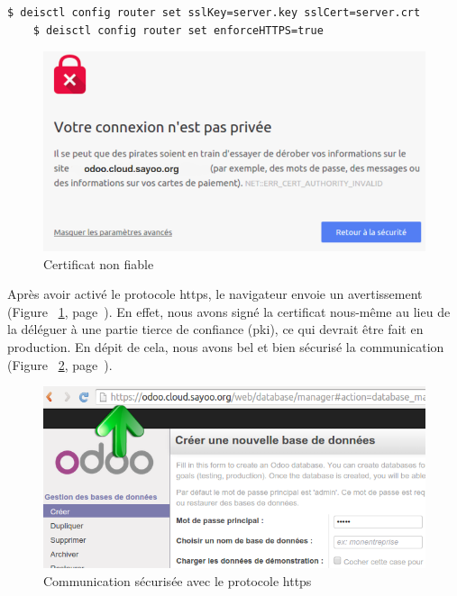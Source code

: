 \begin{onehalfspace}
\begin{lstlisting}[language=bash,caption=Activation du protocole SSL]
	$ deisctl config router set sslKey=server.key sslCert=server.crt
	$ deisctl config router set enforceHTTPS=true
\end{lstlisting}

\begin{figure}[H]
\centering
\includegraphics [scale=0.5]{chapitre5/assets/certificat}
\caption{Certificat non fiable}
\label{fig:certificat}
\end{figure}

Après avoir activé le protocole \acrshort{https}, le navigateur envoie un avertissement (Figure ~\ref{fig:certificat}, page~\pageref{fig:certificat}). En effet, nous avons signé la certificat nous-même au lieu de la déléguer à une partie tierce de confiance (\acrshort{pki}), ce qui devrait être fait en production. En dépit de cela, nous avons bel et bien sécurisé la communication (Figure ~\ref{fig:https}, page~\pageref{fig:https}).

\begin{figure}[H]
\centering
\includegraphics [scale=0.5]{chapitre5/assets/https}
\caption{Communication sécurisée avec le protocole \acrshort{https}}
\label{fig:https}
\end{figure}



\end{onehalfspace}
